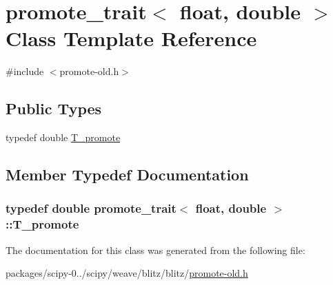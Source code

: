 \hypertarget{classpromote__trait_3_01float_00_01double_01_4}{}\section{promote\+\_\+trait$<$ float, double $>$ Class Template Reference}
\label{classpromote__trait_3_01float_00_01double_01_4}


{\ttfamily \#include $<$promote-\/old.\+h$>$}

\subsection*{Public Types}
\begin{DoxyCompactItemize}
\item 
typedef double \hyperlink{classpromote__trait_3_01float_00_01double_01_4_a71702c703a9f06f12ce2cca72216ae00}{T\+\_\+promote}
\end{DoxyCompactItemize}


\subsection{Member Typedef Documentation}
\hypertarget{classpromote__trait_3_01float_00_01double_01_4_a71702c703a9f06f12ce2cca72216ae00}{}
\subsubsection[{T\+\_\+promote}]{\setlength{\rightskip}{0pt plus 5cm}typedef double {\bf promote\+\_\+trait}$<$ float, double $>$\+::{\bf T\+\_\+promote}}\label{classpromote__trait_3_01float_00_01double_01_4_a71702c703a9f06f12ce2cca72216ae00}


The documentation for this class was generated from the following file\+:\begin{DoxyCompactItemize}
\item 
packages/scipy-\/0../scipy/weave/blitz/blitz/\hyperlink{promote-old_8h}{promote-\/old.\+h}\end{DoxyCompactItemize}
